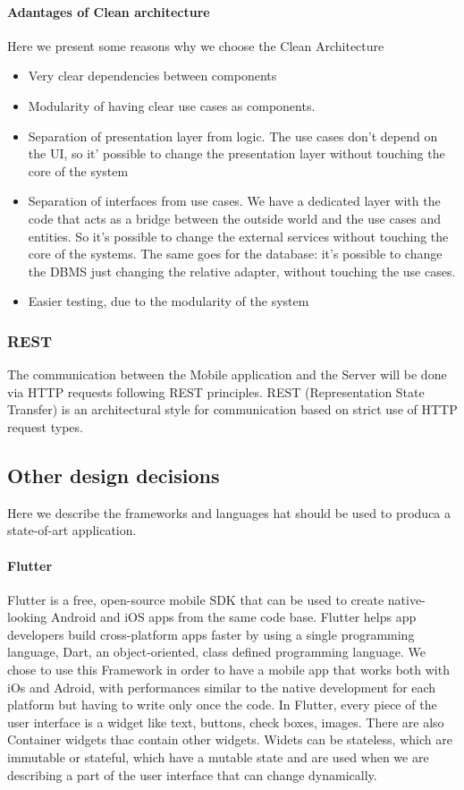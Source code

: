 \paragraph{Adantages of Clean architecture}
Here we present some reasons why we choose the Clean Architecture
\begin{itemize}
  \item Very clear dependencies between components
  \item Modularity of having clear use cases as components.
  \item Separation of presentation layer from logic. The use cases don't depend on the UI, so it' possible to change the presentation layer without touching the core of the system
  \item Separation of interfaces from use cases. We have a dedicated layer with the code that acts as a bridge between the outside world and the use cases and entities. So it's possible to change the external services without touching the core of the systems. The same goes for the database: it's possible to change the DBMS just changing the relative adapter, without touching the use cases.
  \item Easier testing, due to the modularity of the system
\end{itemize}

\subsubsection{REST}
The communication between the Mobile application and the Server will be done via HTTP requests following REST principles. REST (Representation State Transfer) is an architectural style for communication based on strict use of HTTP request types.



\subsection{Other design decisions}
Here we describe the frameworks and languages hat should be used to produca a state-of-art application.

\paragraph{Flutter}
Flutter is a free, open-source mobile SDK that can be used to create native-looking Android and iOS apps from the same code base. Flutter helps app developers build cross-platform apps faster by using a single programming language, Dart, an object-oriented, class defined programming language.
We chose to use this Framework in order to have a mobile app that works both with iOs and Adroid, with performances similar to the native development for each platform but having to write only once the code.
In Flutter, every piece of the user interface is a widget like text, buttons, check boxes, images. There are also Container widgets thac contain other widgets. Widets can be stateless, which are immutable or stateful, which have a mutable state and are used when we are describing a part of the user interface that can change dynamically.

